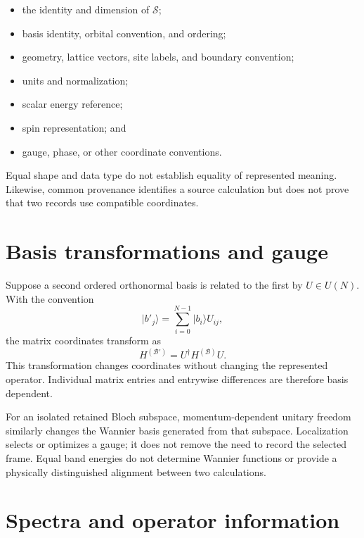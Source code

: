 \begin{itemize}
  \item the identity and dimension of $\mathcal S$;
  \item basis identity, orbital convention, and ordering;
  \item geometry, lattice vectors, site labels, and boundary convention;
  \item units and normalization;
  \item scalar energy reference;
  \item spin representation; and
  \item gauge, phase, or other coordinate conventions.
\end{itemize}

Equal shape and data type do not establish equality of represented meaning.
Likewise, common provenance identifies a source calculation but does not prove
that two records use compatible coordinates.

\section{Basis transformations and gauge}

Suppose a second ordered orthonormal basis is related to the first by
$U\in U(N)$. With the convention
\begin{equation}
  \lvert b'_j\rangle
  =
  \sum_{i=0}^{N-1}\lvert b_i\rangle U_{ij},
\end{equation}
the matrix coordinates transform as
\begin{equation}
  H^{(\mathcal B')}
  =
  U^{\dagger}H^{(\mathcal B)}U.
\end{equation}
This transformation changes coordinates without changing the represented
operator. Individual matrix entries and entrywise differences are therefore
basis dependent.

For an isolated retained Bloch subspace, momentum-dependent unitary freedom
similarly changes the Wannier basis generated from that subspace. Localization
selects or optimizes a gauge; it does not remove the need to record the selected
frame. Equal band energies do not determine Wannier functions or provide a
physically distinguished alignment between two calculations.

\section{Spectra and operator information}

